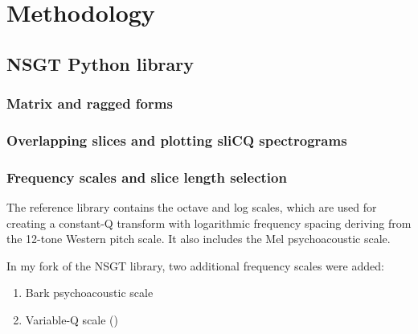 \documentclass[report.tex]{subfiles}
\begin{document}
\section{Methodology}

\subsection{NSGT Python library}

\subsubsection{Matrix and ragged forms}


\subsubsection{Overlapping slices and plotting sliCQ spectrograms}




\subsubsection{Frequency scales and slice length selection}

The reference library contains the octave and log scales, which are used for creating a constant-Q transform with logarithmic frequency spacing deriving from the 12-tone Western pitch scale. It also includes the Mel psychoacoustic scale.

In my fork of the NSGT library, two additional frequency scales were added:

\begin{enumerate}
	\item
		Bark psychoacoustic scale
	\item
		Variable-Q scale (\cite{variableq1,variableq2})
\end{enumerate}

\end{document}
